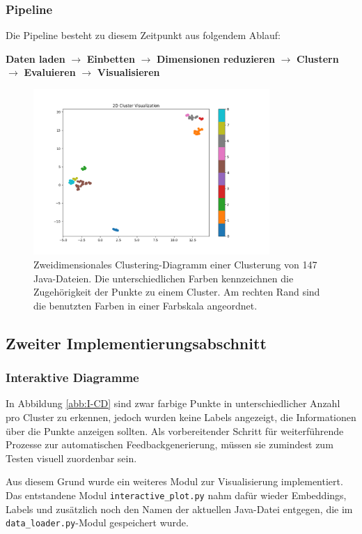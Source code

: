 \subsubsection*{Pipeline}
Die Pipeline besteht zu diesem Zeitpunkt aus folgendem Ablauf:

\textbf{Daten laden} $\rightarrow$ \textbf{Einbetten} $\rightarrow$ \textbf{Dimensionen reduzieren} $\rightarrow$ \textbf{Clustern} $\rightarrow$ \textbf{Evaluieren} $\rightarrow$ \textbf{Visualisieren}

\begin{figure} %
	\centering
	\includegraphics[width=0.8\textwidth]{images/Erstes Clustering-Diagramm.pdf}
	\caption{Zweidimensionales Clustering-Diagramm einer Clusterung von 147 Java-Dateien. Die unterschiedlichen Farben kennzeichnen die Zugehörigkeit der Punkte zu einem Cluster. Am rechten Rand sind die benutzten Farben in einer Farbskala angeordnet.}
	\label{abb:E-CD}
\end{figure}


\subsection{Zweiter Implementierungsabschnitt}
\subsubsection*{Interaktive Diagramme}
In Abbildung \ref{abb:I-CD} sind zwar farbige Punkte in unterschiedlicher Anzahl pro Cluster zu erkennen, jedoch wurden keine Labels angezeigt, die Informationen über die Punkte anzeigen sollten. Als vorbereitender Schritt für weiterführende Prozesse zur automatischen Feedbackgenerierung, müssen sie zumindest zum Testen visuell zuordenbar sein.

Aus diesem Grund wurde ein weiteres Modul zur Visualisierung implementiert. Das entstandene Modul \texttt{interactive\_plot.py} nahm dafür wieder Embeddings, Labels und zusätzlich noch den Namen der aktuellen Java-Datei entgegen, die im \texttt{data\_loader.py}-Modul gespeichert wurde.

